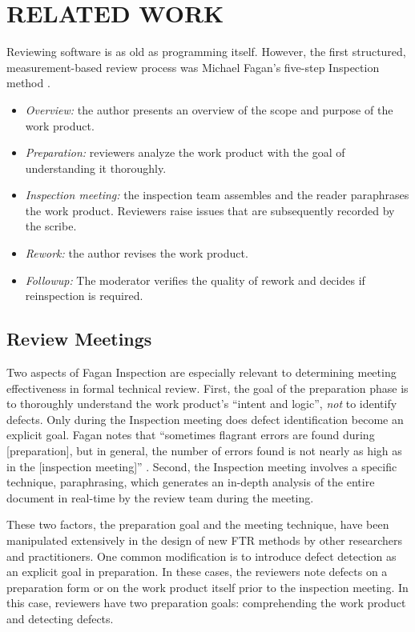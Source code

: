 \section{RELATED WORK} 


Reviewing software is as old as programming itself. However, 
the first structured, measurement-based review process was 
Michael Fagan's five-step Inspection method \cite{Fagan76}. 

\begin{itemize}
\item {\em Overview:} the author presents an overview of the scope and
purpose of the work product.

\item {\em Preparation:} reviewers analyze the work product with the goal
of understanding it thoroughly. 

\item {\em Inspection meeting:} the inspection team assembles and the 
reader paraphrases the work product. Reviewers raise issues that are 
subsequently recorded by the scribe. 

\item {\em Rework:} the author revises the work product. 

\item {\em Followup:} The moderator verifies the quality of rework and 
decides if reinspection is required. 

\end{itemize}

\subsection{Review Meetings}

Two aspects of Fagan Inspection are especially relevant to determining 
meeting effectiveness in formal technical review. First, the goal
of the preparation phase is to thoroughly understand the work product's 
``intent and logic'', {\em not} to identify defects. Only during the 
Inspection meeting does defect identification become an
explicit goal.  Fagan notes that ``sometimes flagrant errors are found
during [preparation], but in general, the number of errors found is not
nearly as high as in the [inspection meeting]'' \cite{Fagan76}.  Second,
the Inspection meeting involves a specific technique, paraphrasing, which
generates an in-depth analysis of the entire document in real-time by the
review team during the meeting.

These two factors, the preparation goal and the meeting technique, have
been manipulated extensively in the design of new FTR methods by other
researchers and practitioners.  One common modification is to introduce
defect detection as an explicit goal in preparation. In these cases, the
reviewers note defects on a preparation form or on the work product itself
prior to the inspection meeting. In this case, reviewers have two preparation 
goals: comprehending the work product and detecting defects.

